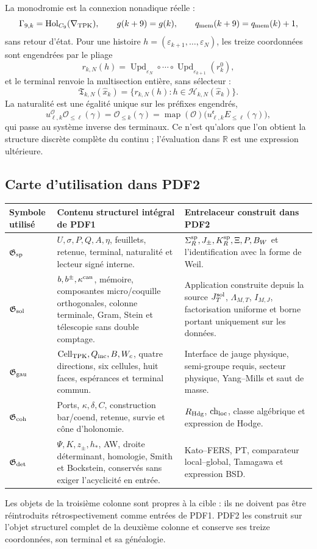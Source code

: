 La monodromie est la connexion nonadique réelle :
\[
 \Gamma_{9,k}=\operatorname{Hol}_{C_9}(\nabla_{\rm TPK}),
 \qquad g(k+9)=g(k),
 \qquad q_{\rm mem}(k+9)=q_{\rm mem}(k)+1,
\]
sans retour d'état. Pour une histoire \(h=(\varepsilon_{k+1},\ldots,\varepsilon_N)\), les treize coordonnées sont engendrées par le pliage
\[
 r_{k,N}(h)=
 \operatorname{Upd}_{\varepsilon_N}\circ\cdots\circ
 \operatorname{Upd}_{\varepsilon_{k+1}}(r^0_{k}),
\]
et le terminal renvoie la multisection entière, sans sélecteur :
\[
 \mathfrak T_{k,N}(\widehat x_k)
 =\{r_{k,N}(h):h\in\mathscr H_{k,N}(\widehat x_k)\}.
\]
La naturalité est une égalité unique sur les préfixes engendrés,
\[
 u_{\ell,k}^{\mathcal O}\mathcal O_{\le\ell}(\gamma)
 =\mathcal O_{\le k}(\gamma)
 =\operatorname{map}(\mathcal O)
   \bigl(u_{\ell,k}^{\mathfrak e}E_{\le\ell}(\gamma)\bigr),
\]
qui passe au système inverse des terminaux. Ce n'est qu'alors que l'on obtient la structure discrète complète du continu ; l'évaluation dans \(\mathbb R\) est une expression ultérieure.

\subsection*{Carte d'utilisation dans PDF2}

\begin{center}
\small
\begin{tabularx}{\textwidth}{@{}p{}X p{}@{}}
\toprule
Symbole utilisé & Contenu structurel intégral de PDF1 &
Entrelaceur construit dans PDF2 \\
\midrule
\(\mathfrak G_{\rm sp}\) &
\(U,\sigma,P,Q,A,\eta\), feuillets, retenue, terminal, naturalité et lecteur signé interne. &
\(\Sigma_R^{\rm sp},J_\pm,K_R^{\rm sp},\Xi,P,B_W\) et l'identification avec la forme de Weil. \\
\(\mathfrak G_{\rm sol}\) &
\(b,b^\pm,\kappa^{\rm can}\), mémoire, composantes micro/coquille orthogonales, colonne terminale, Gram, Stein et télescopie sans double comptage. &
Application construite depuis la source \(J_T^{\rm sol}\), \(\Lambda_{M,T}\), \(I_{M,J}\), factorisation uniforme et borne portant uniquement sur les données. \\
\(\mathfrak G_{\rm gau}\) &
\(\operatorname{Cell}_{\rm TPK},Q_{\rm inc},B,W_c\), quatre directions, six cellules, huit faces, espérances et terminal commun. &
Interface de jauge physique, semi-groupe requis, secteur physique, Yang--Mills et saut de masse. \\
\(\mathfrak G_{\rm coh}\) &
Ports, \(\kappa,\delta,C\), construction bar/coend, retenue, survie et cône d'holonomie. &
\(R_{\rm Hdg}\), \(\mathrm{ch}_{\rm loc}\), classe algébrique et expression de Hodge. \\
\(\mathfrak G_{\rm det}\) &
\(\Psi,K,z_\pm,h_*\), AW, droite déterminant, homologie, Smith et Bockstein, conservés sans exiger l'acyclicité en entrée. &
Kato--FERS, PT, comparateur local--\newline global, Tamagawa et expression BSD. \\
\bottomrule
\end{tabularx}
\end{center}

Les objets de la troisième colonne sont propres à la cible : ils ne doivent pas être réintroduits rétrospectivement comme entrées de PDF1. PDF2 les construit sur l'objet structurel complet de la deuxième colonne et conserve ses treize coordonnées, son terminal et sa généalogie.
